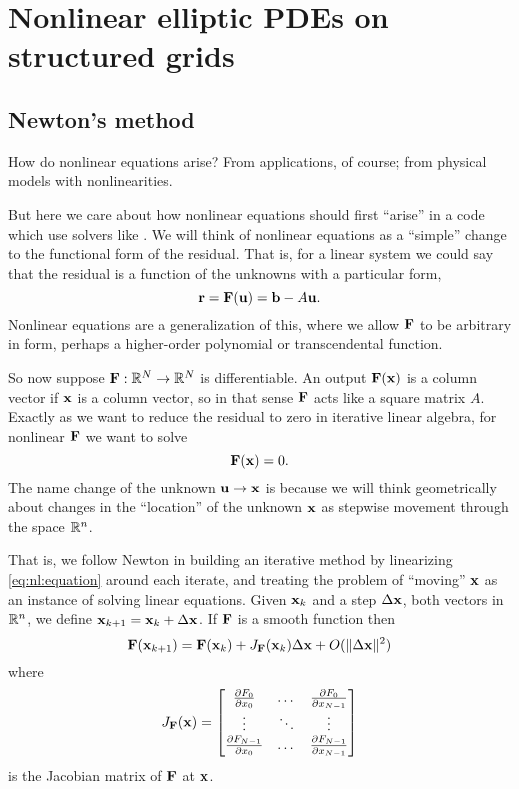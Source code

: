 \renewcommand{\CODELOC}{c/ch4/}

\chapter{Nonlinear elliptic PDEs on structured grids}
\label{chap:nonlinear}

\section{Newton's method}

How do nonlinear equations arise?  From applications, of course; from physical models with nonlinearities.

But here we care about how nonlinear equations should first ``arise'' in a code which use solvers like \PETSc.  We will think of nonlinear equations as a ``simple'' change to the functional form of the residual.  That is, for a linear system we could say that the residual is a function of the unknowns with a particular form,
\begin{equation}
\mathbf{r} = \mathbf{F}(\mathbf{u}) = \mathbf{b} - A \mathbf{u}. \label{eq:nl:linres}
\end{equation}
Nonlinear equations are a generalization of this, where we allow $\mathbf{F}$ to be arbitrary in form, perhaps a higher-order polynomial or transcendental function.

So now suppose $\mathbf{F} : \mathbb{R}^N \to \mathbb{R}^N$ is differentiable.  An output $\mathbf{F}(\mathbf{x})$ is a column vector if $\mathbf{x}$ is a column vector, so in that sense $\mathbf{F}$ acts like a square matrix $A$.  Exactly as we want to reduce the residual to zero in iterative linear algebra, for nonlinear $\mathbf{F}$ we want to solve
\begin{equation}
   \mathbf{F}(\mathbf{x}) = 0.   \label{eq:nl:equation}
\end{equation}
The name change of the unknown $\mathbf{u}\to\mathbf{x}$ is because we will think geometrically about changes in the ``location'' of the unknown $\mathbf{x}$ as stepwise movement through the space $\mathbb{R}^n$.

That is, we follow Newton in building an iterative method by linearizing \eqref{eq:nl:equation} around each iterate, and treating the problem of ``moving'' $\mathbf{x}$ as an instance of solving linear equations.  Given $\mathbf{x}_k$ and a step $\Delta\mathbf{x}$, both vectors in $\mathbb{R}^n$, we define $\mathbf{x}_{k+1} = \mathbf{x}_k + \Delta\mathbf{x}$.  If $\mathbf{F}$ is a smooth function then
\begin{equation}
    \mathbf{F}(\mathbf{x}_{k+1}) = \mathbf{F}(\mathbf{x}_k) + J_{\mathbf{F}}(\mathbf{x}_k) \Delta\mathbf{x} + O(\|\Delta\mathbf{x}\|^2)  \label{eq:nl:expandF}
\end{equation}
where
\begin{equation}
J_{\mathbf{F}}(\mathbf{x}) = \begin{bmatrix}
    \frac{\partial F_0}{\partial x_0} & \dots & \frac{\partial F_0}{\partial x_{N-1}} \\
    \vdots & \ddots & \vdots \\
    \frac{\partial F_{N-1}}{\partial x_0} & \dots & \frac{\partial F_{N-1}}{\partial x_{N-1}}  \end{bmatrix}  \label{eq:nl:jacdefn}
\end{equation}
is the Jacobian matrix of $\mathbf{F}$ at $\mathbf{x}$.

